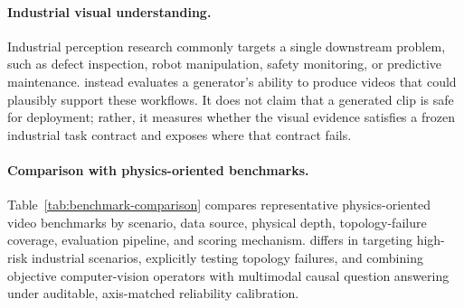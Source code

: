 \paragraph{Industrial visual understanding.}
Industrial perception research commonly targets a single downstream problem, such as defect inspection, robot manipulation, safety monitoring, or predictive maintenance. \FORGE instead evaluates a generator's ability to produce videos that could plausibly support these workflows. It does not claim that a generated clip is safe for deployment; rather, it measures whether the visual evidence satisfies a frozen industrial task contract and exposes where that contract fails.

\paragraph{Comparison with physics-oriented benchmarks.}
Table~\ref{tab:benchmark-comparison} compares representative physics-oriented video benchmarks by scenario, data source, physical depth, topology-failure coverage, evaluation pipeline, and scoring mechanism. \FORGE differs in targeting high-risk industrial scenarios, explicitly testing topology failures, and combining objective computer-vision operators with multimodal causal question answering under auditable, axis-matched reliability calibration.

